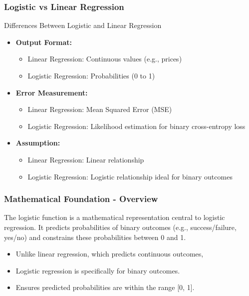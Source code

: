 \documentclass[aspectratio=169]{beamer}
\begin{document}
\begin{frame}[fragile]
    \frametitle{Logistic vs Linear Regression}
    \begin{block}{Differences Between Logistic and Linear Regression}
        \begin{itemize}
            \item \textbf{Output Format:}
                \begin{itemize}
                    \item Linear Regression: Continuous values (e.g., prices)
                    \item Logistic Regression: Probabilities (0 to 1)
                \end{itemize}
            
            \item \textbf{Error Measurement:}
                \begin{itemize}
                    \item Linear Regression: Mean Squared Error (MSE)
                    \item Logistic Regression: Likelihood estimation for binary cross-entropy loss
                \end{itemize}
                
            \item \textbf{Assumption:}
                \begin{itemize}
                    \item Linear Regression: Linear relationship
                    \item Logistic Regression: Logistic relationship ideal for binary outcomes
                \end{itemize}
        \end{itemize}
    \end{block}
\end{frame}

\begin{frame}[fragile]
    \frametitle{Mathematical Foundation - Overview}
    The logistic function is a mathematical representation central to logistic regression. It predicts probabilities of binary outcomes (e.g., success/failure, yes/no) and constrains these probabilities between 0 and 1.

    \begin{itemize}
        \item Unlike linear regression, which predicts continuous outcomes,
        \item Logistic regression is specifically for binary outcomes.
        \item Ensures predicted probabilities are within the range [0, 1].
    \end{itemize}
\end{frame}
\end{document}
